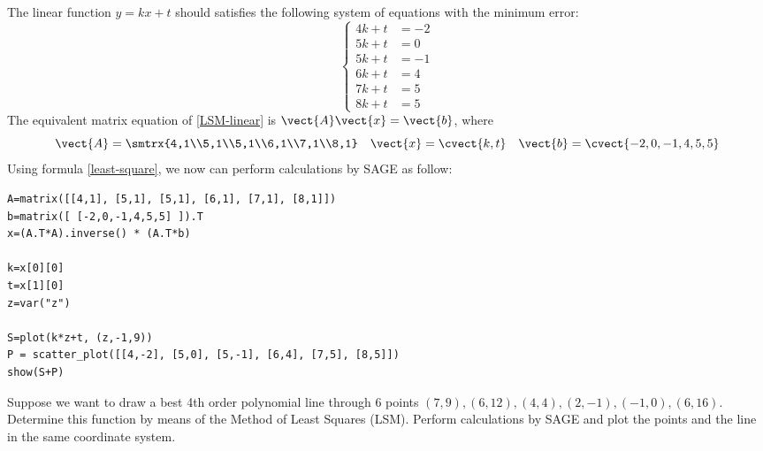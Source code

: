 \begin{solution}\label{least-square}
The linear function $y=kx+t$ should satisfies the following system of equations with the minimum error:
\begin{equation}
\label{LSM-linear}
\begin{cases}
4k+t &= -2 \\
5k+t &= 0 \\
5k+t &= -1 \\
6k+t &= 4 \\
7k+t &= 5 \\
8k+t &= 5 
\end{cases}
\end{equation}
The equivalent matrix equation of \eqref{LSM-linear} is $\vect{A}\vect{x}=\vect{b}$, where
\[ \vect{A}=\smtrx{4,1\\5,1\\5,1\\6,1\\7,1\\8,1} \quad \vect{x}=\cvect{k,t} \quad \vect{b}=\cvect{-2,0,-1,4,5,5} \]
Using formula \eqref{least-square}, we now can perform calculations by SAGE as follow:
\begin{verbatim}
A=matrix([[4,1], [5,1], [5,1], [6,1], [7,1], [8,1]])
b=matrix([ [-2,0,-1,4,5,5] ]).T
x=(A.T*A).inverse() * (A.T*b)

k=x[0][0]
t=x[1][0]
z=var("z")

S=plot(k*z+t, (z,-1,9))
P = scatter_plot([[4,-2], [5,0], [5,-1], [6,4], [7,5], [8,5]])
show(S+P)
\end{verbatim}
\end{solution}

\begin{exercise}
Suppose we want to draw a best 4th order polynomial line through 6 points $(7,9),(6,12),(4,4),(2,-1),(-1,0),(6,16)$. Determine this function by means of the Method of Least Squares (LSM). Perform calculations by SAGE and plot the points and the line in the same coordinate system.
\end{exercise}

